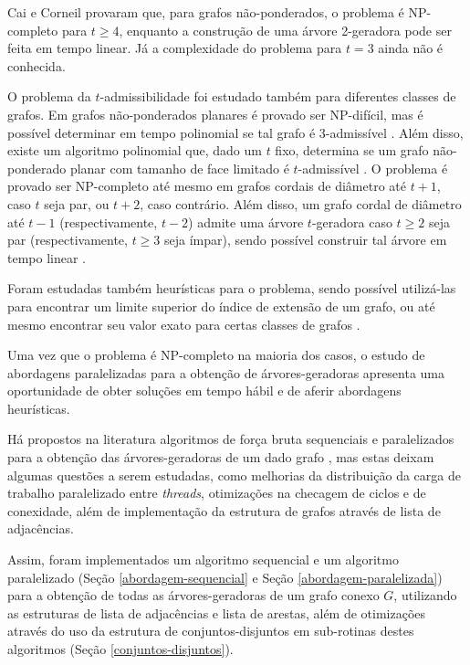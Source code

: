 \documentclass[article,a4paper,12pt,brazil,sumario=tradicional]{abntex2}
\theoremstyle{definition} %
\begin{document}
Cai e Corneil \cite{doi:10.1137/S0895480192237403} provaram que, para grafos não-ponderados, o problema é NP-completo para $t\geq4$, enquanto a construção de uma árvore 2-geradora pode ser feita em tempo linear. Já a complexidade do problema para $t=3$ ainda não é conhecida.

O problema da $t$-admissibilidade foi estudado também para diferentes classes de grafos. Em grafos não-ponderados planares é provado ser NP-difícil, mas é possível determinar em tempo polinomial se tal grafo é $3$-admissível \cite{cunha_marciano_moraes_santiago_santos}. Além disso, existe um algoritmo polinomial que, dado um $t$ fixo, determina se um grafo não-ponderado planar com tamanho de face limitado é $t$-admissível \cite{FEKETE200185}. O problema é provado ser NP-completo até mesmo em grafos cordais de diâmetro até $t + 1$, caso $t$ seja par, ou $t + 2$, caso contrário. Além disso, um grafo cordal de diâmetro até $t - 1$ (respectivamente, $t - 2$) admite uma árvore $t$-geradora caso $t\geq2$ seja par (respectivamente, $t\geq3$ seja ímpar), sendo possível construir tal árvore em tempo linear \cite{BRANDSTADT2004329}.

Foram estudadas também heurísticas para o problema, sendo possível utilizá-las para encontrar um limite superior do índice de extensão de um grafo, ou até mesmo encontrar seu valor exato para certas classes de grafos \cite{COUTO2022106265} \cite{cunha_marciano_moraes_santiago_santos}.

Uma vez que o problema é NP-completo na maioria dos casos, o estudo de abordagens paralelizadas para a obtenção de árvores-geradoras apresenta uma oportunidade de obter soluções em tempo hábil e de aferir abordagens heurísticas.

Há propostos na literatura algoritmos de força bruta sequenciais e paralelizados para a obtenção das árvores-geradoras de um dado grafo \cite{COUTO2022106265} \cite{cunha_marciano_moraes_santiago_santos}, mas estas deixam algumas questões a serem estudadas, como melhorias da distribuição da carga de trabalho paralelizado entre \textit{threads}, otimizações na checagem de ciclos e de conexidade, além de implementação da estrutura de grafos através de lista de adjacências.

Assim, foram implementados um algoritmo sequencial e um algoritmo paralelizado (Seção \ref{abordagem-sequencial} e Seção \ref{abordagem-paralelizada}) para a obtenção de todas as árvores-geradoras de um grafo conexo $G$, utilizando as estruturas de lista de adjacências e lista de arestas, além de otimizações através do uso da estrutura de conjuntos-disjuntos em sub-rotinas destes algoritmos (Seção \ref{conjuntos-disjuntos}).
\end{document}
